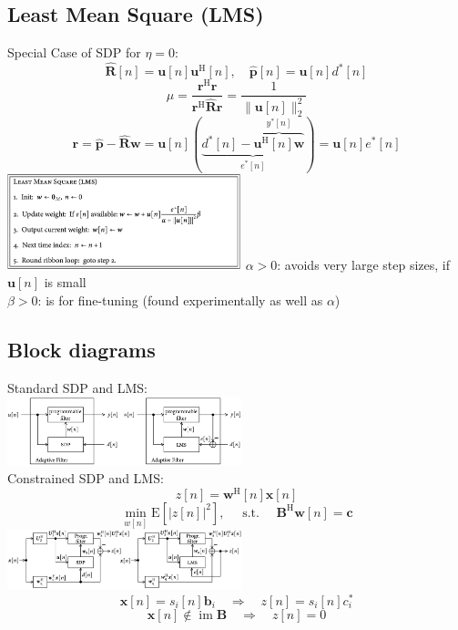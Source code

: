 \documentclass[english]{latex4ei/latex4ei_sheet}
\begin{document}
\begin{sectionbox}
  \subsection{Least Mean Square (LMS)}
  Special Case of SDP for $\eta = 0$:
  $$\widehat{\boldsymbol{R}}[n]=\boldsymbol{u}[n] \boldsymbol{u}^{\mathrm{H}}[n], \quad \widehat{\boldsymbol{p}}[n]=\boldsymbol{u}[n] d^{*}[n]$$
  $$\mu=\frac{\boldsymbol{r}^{\mathrm{H}} \boldsymbol{r}}{\boldsymbol{r}^{\mathrm{H}} \widehat{\boldsymbol{R}} \boldsymbol{r}}=\frac{1}{\|\boldsymbol{u}[n]\|_{2}^{2}}$$
  $$\boldsymbol{r}=\widehat{\boldsymbol{p}}-\widehat{\boldsymbol{R}} \boldsymbol{w}=\boldsymbol{u}[n] (\underbrace{d^{*}[n]-\overbrace{\boldsymbol{u}^{\mathrm{H}}[n] \boldsymbol{w}}^{y^{*}[n]}}_{e^{*}[n]}) =\boldsymbol{u}[n] e^{*}[n]$$
  \includegraphics[width = 6.8cm]{img/lms.png}
  $\alpha > 0$: avoids very large step sizes, if $\boldsymbol{u}[n]$ is small\\
  $\beta > 0$: is for fine-tuning (found experimentally as well as $\alpha$)\\ 
\end{sectionbox}

\begin{sectionbox}
  \subsection{Block diagrams}
  Standard SDP and LMS:\\
  \includegraphics[width = 6.8cm]{img/blk-diagrams.png}\\
  Constrained SDP and LMS:
  $$z[n]=\boldsymbol{w}^{\mathrm{H}}[n] \boldsymbol{x}[n]$$
  $$\min _{w[n]} \mathrm{E}\left[|z[n]|^{2}\right], \quad \text { s.t. } \quad \boldsymbol{B}^{\mathrm{H}} \boldsymbol{w}[n]=\boldsymbol{c}$$
  \includegraphics[width = 6.8cm]{img/blk-diagrams2.png}
  $$\boldsymbol{x}[n]=s_{i}[n] \boldsymbol{b}_{i} \quad \Longrightarrow \quad z[n]=s_{i}[n] c_{i}^{*}$$
  $$\boldsymbol{x}[n]\notin \operatorname{im} \boldsymbol{B} \quad \Longrightarrow \quad z[n]=0$$

\end{sectionbox}
\end{document}
